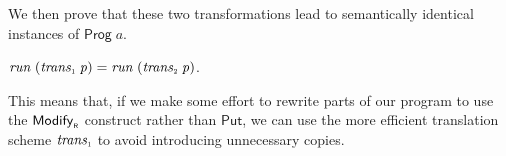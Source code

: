\documentclass{llncs}
\newcommand{\Conid}[1]{\mathit{#1}}
\newcommand{\Varid}[1]{\mathit{#1}}
\let\Varid\mathit
\let\Conid\mathsf
\begin{document}
We then prove that these two transformations lead to semantically identical
instances of \ensuremath{\Conid{Prog}\;\Varid{a}}.
\begin{lemma}
  \ensuremath{\Varid{run}\;(\Varid{trans}_{\scaleobj{0.7}{1}}\;\Varid{p})\mathrel{=}\Varid{run}\;(\Varid{trans}_{\scaleobj{0.7}{2}}\;\Varid{p})}. \checkmark
\end{lemma}
This means that, if we make some effort to rewrite parts of our program to use
the \ensuremath{\Conid{Modify}_{\scaleobj{0.7}{\sf R}}} construct rather than \ensuremath{\Conid{Put}}, we can use the more efficient
translation scheme \ensuremath{\Varid{trans}_{\scaleobj{0.7}{1}}} to avoid introducing unnecessary copies.

\end{document}

